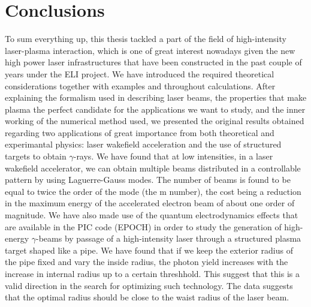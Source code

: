\documentclass[12pt, class=report, crop=false]{standalone}
\begin{document}
\chapter{Conclusions}%
\label{chap:conclusions}

To sum everything up, this thesis tackled a part of the field of high-intensity laser-plasma interaction, which is one of great interest nowadays given the new high power laser infrastructures that have been constructed in the past couple of years under the ELI project. We have introduced the required theoretical considerations together with examples and throughout calculations. After explaining the formalism used in describing laser beams, the properties that make plasma the perfect candidate for the applications we want to study, and the inner working of the numerical method used, we presented the original results obtained regarding two applications of great importance from both theoretical and experimantal physics: laser wakefield acceleration and the use of structured targets to obtain \(\gamma\)-rays. We have found that at low intensities, in a laser wakefield accelerator, we can obtain multiple beams distributed in a controllable pattern by using Laguerre-Gauss modes. The number of beams is found to be equal to twice the order of the mode (the m number), the cost being a reduction in the maximum energy of the accelerated electron beam of about one order of magnitude. We have also made use of the quantum electrodynamics effects that are available in the PIC code (EPOCH) in order to study the generation of high-energy \(\gamma\)-beams by passage of a high-intensity laser through a structured plasma target shaped like a pipe. We have found that if we keep the exterior radius of the pipe fixed and vary the inside radius, the photon yield increases with the increase in internal radius up to a certain threshhold. This suggest that this is a valid direction in the search for optimizing such technology. The data suggests that the optimal radius should be close to the waist radius of the laser beam.
\end{document}
